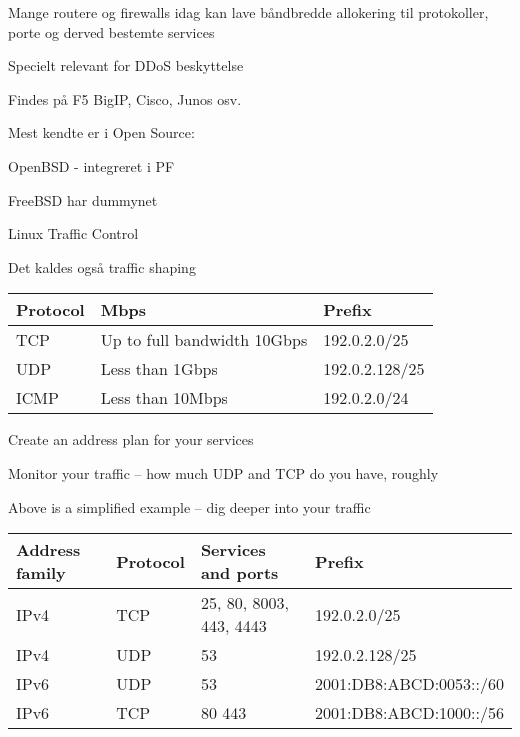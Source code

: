\documentclass[Screen16to9,17pt]{foils}
\begin{document}

\begin{list1}
\item Mange routere og firewalls idag kan lave båndbredde allokering til
  protokoller, porte og derved bestemte services
  \item Specielt relevant for DDoS beskyttelse
  \item Findes på F5 BigIP, Cisco, Junos osv.
\item Mest kendte er i Open Source:
\begin{list2}
\item OpenBSD - integreret i PF
\item FreeBSD har dummynet
\item Linux Traffic Control
\end{list2}
\item Det kaldes også traffic shaping
\end{list1}




\begin{tabularx}{\textwidth-5cm}{|p{5cm}|p{7cm}|X|} \hline
{\bf Protocol} & {\bf Mbps} & {\bf Prefix}\\\hline
TCP & Up to full bandwidth 10Gbps & 192.0.2.0/25 \\\hline
UDP & Less than 1Gbps & 192.0.2.128/25 \\\hline
ICMP & Less than 10Mbps & 192.0.2.0/24 \\\hline
\end{tabularx}


\begin{list2}
\item Create an address plan for your services
\item Monitor your traffic -- how much UDP and TCP do you have, roughly

\item Above is a simplified example -- dig deeper into your traffic
\end{list2}


\begin{tabularx}{\textwidth-5cm}{|p{2cm}|p{2cm}|p{7cm}|X|} \hline
{\bf Address family} & {\bf Protocol} & {\bf Services and ports} & {\bf Prefix}\\\hline
IPv4 & TCP & 25, 80, 8003, 443, 4443 & 192.0.2.0/25 \\\hline
IPv4 & UDP & 53 & 192.0.2.128/25 \\\hline
IPv6 & UDP & 53  & 2001:DB8:ABCD:0053::/60 \\\hline
IPv6 & TCP & 80 443 & 2001:DB8:ABCD:1000::/56 \\\hline
\end{tabularx}
\end{document}
